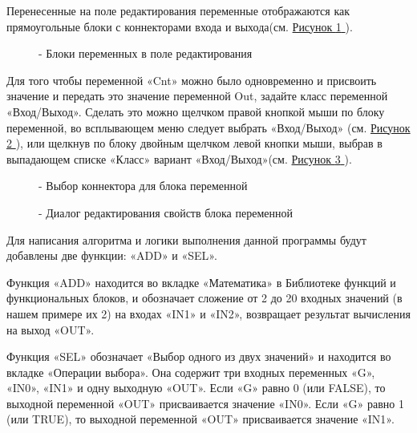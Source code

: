 \documentclass[letterpaper,10pt,russian]{sphinxmanual}
\begin{document}
Перенесенные на поле редактирования переменные отображаются как
прямоугольные блоки с коннекторами входа и выхода(см. \hyperref[usage_guide/work_with_project:image185]{Рисунок \ref{usage_guide/work_with_project:image185} }).
\begin{figure}[htbp]
\centering
\capstart

\noindent{}
\caption{- Блоки переменных в поле редактирования}\label{usage_guide/work_with_project:image185}\end{figure}

Для того чтобы переменной «Cnt» можно было одновременно и присвоить
значение и передать это значение переменной Out, задайте класс
переменной «Вход/Выход». Сделать это можно щелчком правой кнопкой мыши
по блоку переменной, во всплывающем меню следует выбрать «Вход/Выход»
(см. \hyperref[usage_guide/work_with_project:image166-2]{Рисунок \ref{usage_guide/work_with_project:image166-2} }), или щелкнув по блоку двойным щелчком левой кнопки мыши,
выбрав в выпадающем списке «Класс» вариант «Вход/Выход»(см. \hyperref[usage_guide/work_with_project:image167-2]{Рисунок \ref{usage_guide/work_with_project:image167-2} }).
\begin{figure}[htbp]
\centering
\capstart

\noindent{}
\caption{- Выбор коннектора для блока переменной}\label{usage_guide/work_with_project:image166-2}\end{figure}
\begin{figure}[htbp]
\centering
\capstart

\noindent{}
\caption{- Диалог редактирования свойств блока переменной}\label{usage_guide/work_with_project:image167-2}\end{figure}

Для написания алгоритма и логики выполнения данной программы будут
добавлены две функции: «ADD» и «SEL».

Функция «ADD» находится во вкладке «Математика» в Библиотеке функций и
функциональных блоков, и обозначает сложение от 2 до 20
входных значений (в нашем примере их 2) на входах «IN1» и «IN2»,
возвращает результат вычисления на выход «OUT».

Функция «SEL» обозначает «Выбор одного из двух значений» и находится во
вкладке «Операции выбора». Она содержит три входных переменных «G»,
«IN0», «IN1» и одну выходную «OUT». Если «G» равно 0 (или FALSE), то
выходной переменной «OUT» присваивается значение «IN0». Если «G» равно 1
(или TRUE), то выходной переменной «OUT» присваивается значение «IN1».
\end{document}
